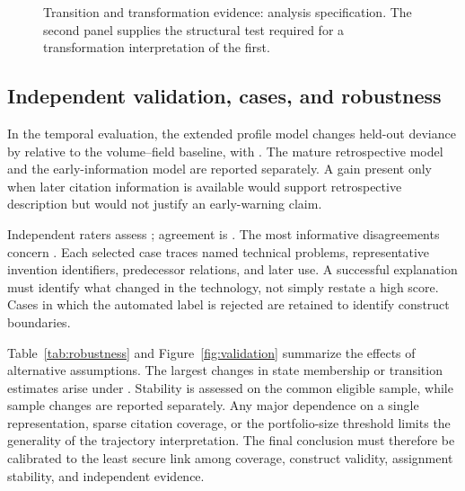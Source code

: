 \begin{figure}[tbp]\centering
{}
\hfill
{}
\caption{Transition and transformation evidence: analysis specification. The second panel supplies the structural test required for a transformation interpretation of the first.}
\label{fig:transitions}
\end{figure}


\subsection{Independent validation, cases, and robustness}
In the temporal evaluation, the extended profile model changes held-out deviance
by  relative to the volume--field baseline, with
. The mature retrospective model
and the early-information model are reported separately. A gain present only when
later citation information is available would support retrospective description
but would not justify an early-warning claim.

Independent raters assess ; agreement is
. The most informative disagreements
concern . Each selected case traces
named technical problems, representative invention identifiers, predecessor
relations, and later use. A successful explanation must identify what changed
in the technology, not simply restate a high score. Cases in which the automated
label is rejected are retained to identify construct boundaries.

Table~\ref{tab:robustness} and Figure~\ref{fig:validation} summarize the effects of
alternative assumptions. The largest changes in state membership or transition
estimates arise under . Stability is assessed on
the common eligible sample, while sample changes are reported separately. Any
major dependence on a single representation, sparse citation coverage, or the
portfolio-size threshold limits the generality of the trajectory interpretation.
The final conclusion must therefore be calibrated to the least secure link among
coverage, construct validity, assignment stability, and independent evidence.

